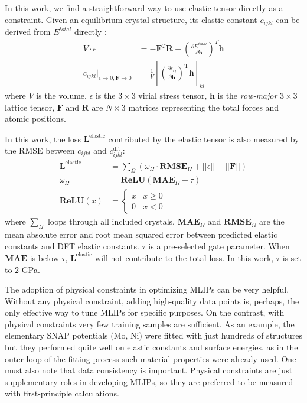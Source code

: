 \documentclass[prb,reprint,superscriptaddress]{revtex4-2}
\begin{document}
In this work, we find a straightforward way to use elastic tensor directly as a 
constraint. Given an equilibrium crystal structure, its elastic constant 
$c_{ijkl}$ can be derived from $E^{total}$ directly \cite{Elastic}:
\begin{align}
\label{eq:virial}
V \cdot \epsilon & = -\mathbf{F}^{T}\mathbf{R} + \left(
    \frac{\partial E^{total}}{\partial \mathbf{h}}\right)^T \mathbf{h} \\ 
\label{eq:cijkl}
c_{ijkl} |_{\epsilon \to 0, \mathbf{F} \to 0} & = \frac{1}{V}\left[
    \left( 
        \frac{\partial{\epsilon_{ij}}}{\partial{\mathbf{h}}}
    \right)^{\mathrm{T}}\mathbf{h}
\right]_{kl}
\end{align}
where $V$ is the volume, $\epsilon$ is the $3 \times 3$ virial stress tensor, 
$\mathbf{h}$ is the \textit{row-major} $3 \times 3$ lattice tensor, $\mathbf{F}$ 
and $\mathbf{R}$ are $N \times 3$ matrices representing the total forces and 
atomic positions.

In this work, the loss $\mathbf{L}^{\mathrm{elastic}}$ contributed by the 
elastic tensor is also measured by the RMSE between $c_{ijkl}$ and 
$c_{ijkl}^{\mathrm{dft}}$:
\begin{align}
\label{eq:cijkl_loss}
\mathbf{L}^{\mathrm{elastic}} 
& = \sum_{\Omega}{\left(
    \omega_{\Omega} \cdot \mathbf{RMSE}_{\Omega} 
    + ||\epsilon|| + ||\mathbf{F}||
\right)}
 \\
\label{eq:cijkl_loss_gate}
\omega_{\Omega} & = \mathbf{ReLU}(\mathbf{MAE}_{\Omega} - \tau) \\
\label{eq:relu}
\mathbf{ReLU}(x) & = \begin{cases}
    x & x \ge 0 \\
    0 & x < 0
\end{cases}
\end{align}
where $\sum_{\Omega}$ loops through all included crystals, 
$\mathbf{MAE}_{\Omega}$ and $\mathbf{RMSE}_{\Omega}$ are the mean absolute error 
and root mean squared error between predicted elastic constants and DFT elastic 
constants. $\tau$ is a pre-selected gate parameter. 
When $\mathbf{MAE}$ is below $\tau$, $\mathbf{L}^{\mathrm{elastic}}$ will not 
contribute to the total loss. In this work, $\tau$ is set to 2 GPa.

The adoption of physical constraints in optimizing MLIPs can be very helpful. 
Without any physical constraint, adding high-quality data points is, perhaps, 
the only effective way to tune MLIPs for specific purposes. On the contrast, 
with physical constraints very few training samples are sufficient.
As an example, the elementary SNAP potentials (Mo, Ni) were fitted with just 
hundreds of structures but they performed quite well on elastic constants and 
surface energies, as in the outer loop \cite{SNAP_Mo} of the fitting process 
such material properties were already used. One must also note that data 
consistency is important. Physical constraints are just supplementary roles in 
developing MLIPs, so they are preferred to be measured with first-principle 
calculations.
\end{document}
